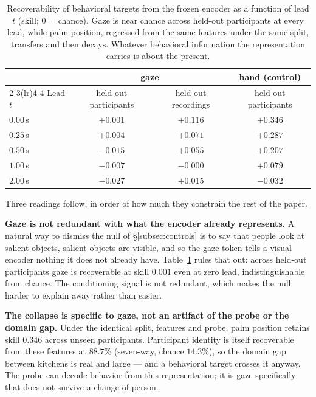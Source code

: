 \begin{table}[t]
  \caption{Recoverability of behavioral targets from the frozen encoder as a
  function of lead $t$ (skill; $0$ = chance). Gaze is near chance across held-out
  participants at every lead, while palm position, regressed from the same
  features under the same split, transfers and then decays. Whatever behavioral
  information the representation carries is about the present.}
  \label{tab:horizon}
  \centering
  \begin{tabular}{lccc}
    \toprule
    & \multicolumn{2}{c}{gaze} & hand (control) \\
    \cmidrule(lr){2-3}\cmidrule(lr){4-4}
    Lead $t$ & held-out participants & held-out recordings & held-out participants \\
    \midrule
    $0.00$\,s & $+0.001$ & $+0.116$ & $+0.346$ \\
    $0.25$\,s & $+0.004$ & $+0.071$ & $+0.287$ \\
    $0.50$\,s & $-0.015$ & $+0.055$ & $+0.207$ \\
    $1.00$\,s & $-0.007$ & $-0.000$ & $+0.079$ \\
    $2.00$\,s & $-0.027$ & $+0.015$ & $-0.032$ \\
    \bottomrule
  \end{tabular}
\end{table}

Three readings follow, in order of how much they constrain the rest of the paper.

\textbf{Gaze is not redundant with what the encoder already represents.} A
natural way to dismiss the null of \S\ref{subsec:controls} is to say that people
look at salient objects, salient objects are visible, and so the gaze token tells
a visual encoder nothing it does not already have. Table~\ref{tab:horizon} rules
that out: across held-out participants gaze is recoverable at skill $0.001$ even
at zero lead, indistinguishable from chance. The conditioning signal is not
redundant, which makes the null harder to explain away rather than easier.

\textbf{The collapse is specific to gaze, not an artifact of the probe or the
domain gap.} Under the identical split, features and probe, palm position retains
skill $0.346$ across unseen participants. Participant identity is itself
recoverable from these features at $88.7\%$ (seven-way, chance $14.3\%$), so the
domain gap between kitchens is real and large --- and a behavioral target crosses
it anyway. The probe can decode behavior from this representation; it is gaze
specifically that does not survive a change of person.

